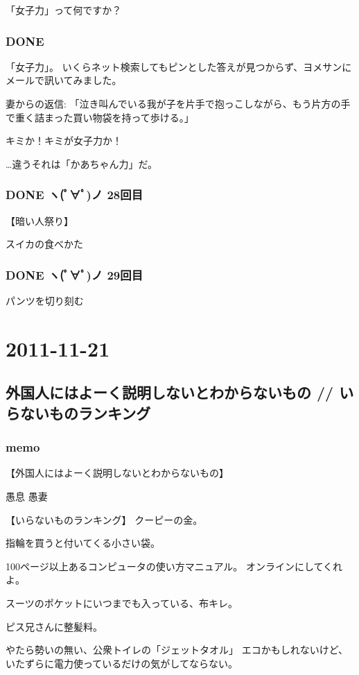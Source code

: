 \documentclass[11pt]{article}
\begin{document}
「女子力」って何ですか？
\subsubsection{\textbf{DONE}}
\label{sec-33_1_3}

「女子力」。
いくらネット検索してもピンとした答えが見つからず、ヨメサンにメールで訊いてみました。

妻からの返信:
「泣き叫んでいる我が子を片手で抱っこしながら、もう片方の手で重く詰まった買い物袋を持って歩ける。」

キミか！キミが女子力か！

\ldots{}違うそれは「かあちゃん力」だ。
\subsubsection{\textbf{DONE} ヽ(ﾟ∀ﾟ)ノ 28回目}
\label{sec-33_1_4}

【暗い人祭り】

スイカの食べかた
\subsubsection{\textbf{DONE} ヽ(ﾟ∀ﾟ)ノ 29回目}
\label{sec-33_1_5}

パンツを切り刻む
\section{2011-11-21}
\label{sec-34}
\subsection{外国人にはよーく説明しないとわからないもの // いらないものランキング}
\label{sec-34_1}
\subsubsection{memo}
\label{sec-34_1_1}

【外国人にはよーく説明しないとわからないもの】

愚息
愚妻

【いらないものランキング】
クーピーの金。

指輪を買うと付いてくる小さい袋。

100ページ以上あるコンピュータの使い方マニュアル。
オンラインにしてくれよ。

スーツのポケットにいつまでも入っている、布キレ。

ピス兄さんに整髪料。

やたら勢いの無い、公衆トイレの「ジェットタオル」
エコかもしれないけど、いたずらに電力使っているだけの気がしてならない。
\end{document}
